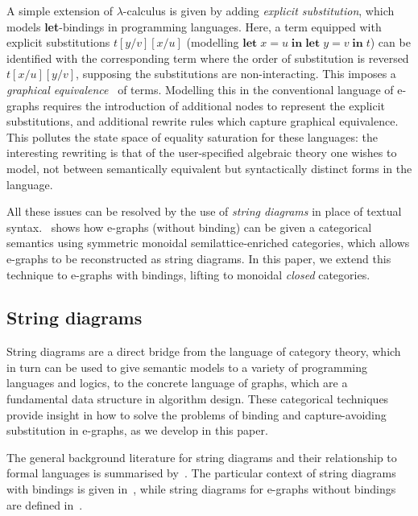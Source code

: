 A simple extension of $\lambda$-calculus is given by adding \emph{explicit substitution}, which models \textbf{let}-bindings in programming languages.
Here, a term equipped with explicit substitutions $t[y/v][x/u]$ (modelling $\textbf{let} \; x = u \; \textbf{in} \; \textbf{let} \; y = v \; \textbf{in} \; t$) can be identified with the corresponding term where the order of substitution is reversed $t[x/u][y/v]$, supposing the substitutions are non-interacting.
This imposes a \emph{graphical equivalence}~\cite{accattoli2014nonstandard} of terms.
Modelling this in the conventional language of e-graphs requires the introduction of additional nodes to represent the explicit substitutions, and additional rewrite rules which capture graphical equivalence.
This pollutes the state space of equality saturation for these languages: the interesting rewriting is that of the user-specified algebraic theory one wishes to model, not between semantically equivalent but syntactically distinct forms in the language.

All these issues can be resolved by the use of \emph{string diagrams} in place of textual syntax.
\citet{tiurin2025equivalencehypergraphsdporewriting}~shows how e-graphs (without binding) can be given a categorical semantics using symmetric monoidal semilattice-enriched categories, which allows e-graphs to be reconstructed as string diagrams.
In this paper, we extend this technique to e-graphs with bindings, lifting to monoidal \emph{closed} categories.

\subsection{String diagrams}

String diagrams are a direct bridge from the language of category theory, which in turn can be used to give semantic models to a variety of programming languages and logics, to the concrete language of graphs, which are a fundamental data structure in algorithm design.
These categorical techniques provide insight in how to solve the problems of binding and capture-avoiding substitution in e-graphs, as we develop in this paper.

The general background literature for string diagrams and their relationship to formal languages is summarised by~\citet{piedeleu2023introductionstringdiagramscomputer}.
The particular context of string diagrams with bindings is given in~\citet{ghica2024stringdiagramslambdacalculifunctional}, while string diagrams for e-graphs without bindings are defined in~\citet{tiurin2025equivalencehypergraphsdporewriting}.


